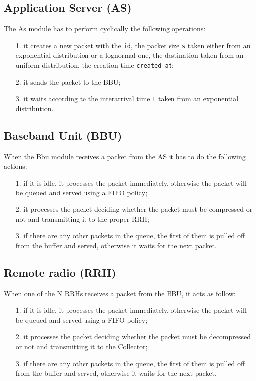\documentclass[11pt,a4paper,oneside, openright]{article}
\begin{document}
\subsection{Application Server (AS)}
The As module has to perform cyclically the following operations:
\begin{itemize}
    \item[1.] it creates a new packet with the \texttt{id}, the packet size \texttt{s} taken either from an exponential distribution or a lognormal one, the destination taken from an uniform distribution, the creation time \texttt{created\_at};
    \item[2.] it sends the packet to the BBU;
    \item[3.] it waits according to the interarrival time \texttt{t} taken from an exponential distribution.
\end{itemize}

\subsection{Baseband Unit (BBU)}
When the Bbu module receives a packet from the AS it has to do the following actions:
\begin{itemize}
    \item[1.] if it is idle, it processes the packet immediately, otherwise the packet will be queued and served using a FIFO policy;
    \item[2.] it processes the packet deciding whether the packet must be compressed or not and transmitting it to the proper RRH;
    \item[3.] if there are any other packets in the queue, the first of them is pulled off from the buffer and served, otherwise it waits for the next packet.
\end{itemize}

\subsection{Remote radio (RRH)}
When one of the N RRHs receives a packet from the BBU, it acts as follow:
\begin{itemize}
    \item[1.] if it is idle, it processes the packet immediately, otherwise the packet will be queued and served using a FIFO policy;
    \item[2.] it processes the packet deciding whether the packet must be decompressed or not and transmitting it to the Collector;
    \item[3.] if there are any other packets in the queue, the first of them is pulled off from the buffer and served, otherwise it waits for the next packet.
\end{itemize}
\end{document}
